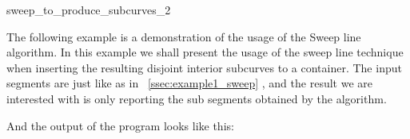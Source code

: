 \begin{ccRefFunction}{sweep_to_produce_subcurves_2}


\ccExample
\label{ssec:example3_sweep}
The following example is a demonstration of the usage of the \ccc
{Sweep line} algorithm. In this example we shall present the usage of
the sweep line technique when inserting the resulting disjoint
interior subcurves to a container. The input segments are just like as
in ~\ref{ssec:example1_sweep} , and the result we are interested with
is only reporting the sub segments obtained by the 
algorithm.


And the output of the program looks like this:


\end{ccRefFunction}













